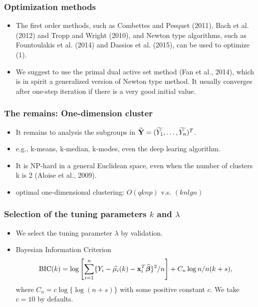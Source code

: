 \documentclass[hyperref={pdfpagelabels=false}]{beamer}
\begin{document}
\begin{frame}
	\frametitle{Optimization methods}
	\begin{itemize}
		\item The first order methods, such as Combettes and Pesquet (2011), Bach et al. (2012) and Tropp and Wright
		(2010), and Newton type algorithms, such as Fountoulakis et al. (2014) and Dassios et al. (2015), can be used
		to optimize (1).
		\item We suggest to use the primal dual active set method (Fan et al., 2014), which is in spirit a
		generalized version of Newton type method. It usually converges after one-step iteration if there is a very
		good initial value.
	\end{itemize}
\end{frame}

\begin{frame}
	\frametitle{The remains: One-dimension cluster}
	\begin{itemize}
		\item It remains to analysis the subgroups in $\widetilde{\mathbf{Y}} = (\widetilde{Y_1},\ldots,\widetilde{Y_n})^T$.
		\item e.g., k-means, k-median, k-modes, even the deep learing algorithm.
		\item It is NP-hard in a general Euclidean space, even when the number of clusters k is 2  (Aloise et al., 2009).
		\item optimal one-dimensional clustering: $O(qknp)$ v.s. $(kn lg n)$ 
	\end{itemize}
\end{frame}

\begin{frame}
	\frametitle{Selection of the tuning parameters $k$ and $\lambda$}
	\begin{itemize}
		\item We select the tuning parameter $\lambda$ by validation.
		\item Bayesian Information Criterion
		$$
		\mathrm{BIC}(k) = \log \left[\sum_{i = 1}^n\{Y_i - \widehat{\mu_i}(k) - {\bf x}_i^T\widehat{\bm{\beta}}\}^2/n\right] + C_n \log n/n(k + s),
		$$
		where $C_n = c\log\{\log(n+s)\}$ with some positive constant $c$. We take $c = 10$ by defaults.
	\end{itemize}
\end{frame}
\end{document}
